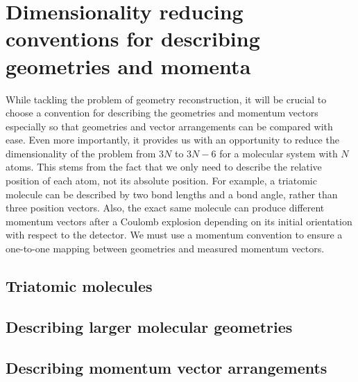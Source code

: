 \section{Dimensionality reducing conventions for describing geometries and momenta} \label{sec:conventions}
While tackling the problem of geometry reconstruction, it will be crucial to choose a convention for describing the geometries and momentum vectors especially so that geometries and vector arrangements can be compared with ease. Even more importantly, it provides us with an opportunity to reduce the dimensionality of the problem from $3N$ to $3N-6$ for a molecular system with $N$ atoms. This stems from the fact that we only need to describe the relative position of each atom, not its absolute position. For example, a triatomic molecule can be described by two bond lengths and a bond angle, rather than three position vectors. Also, the exact same molecule can produce different momentum vectors after a Coulomb explosion depending on its initial orientation with respect to the detector. We must use a momentum convention to ensure a one-to-one mapping between geometries and measured momentum vectors.

\subsection{Triatomic molecules}
\subsection{Describing larger molecular geometries}
\subsection{Describing momentum vector arrangements}